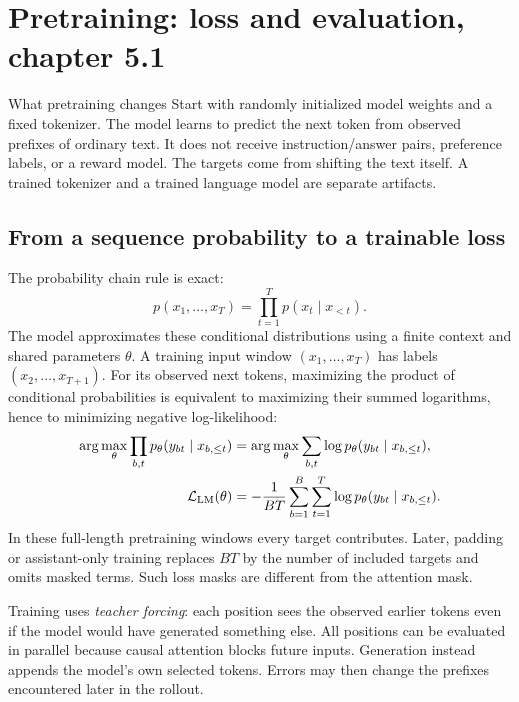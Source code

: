 \section{Pretraining: loss and evaluation, chapter 5.1}
\label{sec:pretraining-loss}

\begin{studybox}{What pretraining changes}
Start with randomly initialized model weights and a fixed tokenizer. The model
learns to predict the next token from observed prefixes of ordinary text. It
does not receive instruction/answer pairs, preference labels, or a reward model.
The targets come from shifting the text itself. A trained tokenizer and a
trained language model are separate artifacts.
\end{studybox}



\subsection{From a sequence probability to a trainable loss}
The probability chain rule is exact:
\[
p(x_1,\ldots,x_T)=\prod_{t=1}^{T}p(x_t\mid x_{<t}).
\]
The model approximates these conditional distributions using a finite context
and shared parameters $\theta$. A training input window $(x_1,\ldots,x_T)$ has
labels $(x_2,\ldots,x_{T+1})$. For its observed next tokens, maximizing the
product of conditional probabilities is equivalent to maximizing their summed
logarithms, hence to minimizing negative log-likelihood:
\begin{align*}
\arg\max_\theta\prod_{b,t}p_\theta(y_{bt}\mid x_{b,\le t})
&=\arg\max_\theta\sum_{b,t}\log p_\theta(y_{bt}\mid x_{b,\le t}),\\
\mathcal L_{\rm LM}(\theta)
&=-\frac{1}{BT}\sum_{b=1}^{B}\sum_{t=1}^{T}
\log p_\theta(y_{bt}\mid x_{b,\le t}).
\end{align*}
In these full-length pretraining windows every target contributes. Later, padding
or assistant-only training replaces $BT$ by the number of included targets and
omits masked terms. Such loss masks are different from the attention mask.

Training uses \emph{teacher forcing}: each position sees the observed earlier
tokens even if the model would have generated something else. All positions
can be evaluated in parallel because causal attention blocks future inputs.
Generation instead appends the model's own selected tokens. Errors may then
change the prefixes encountered later in the rollout.

